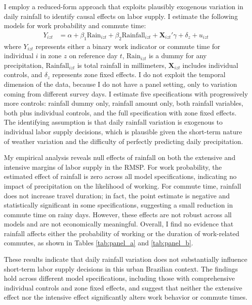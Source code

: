 I employ a reduced-form approach that exploits plausibly exogenous variation in daily rainfall to identify causal effects on labor supply. I estimate the following models for work probability and commute time:
\begin{align*}
Y_{izt} &= \alpha + \beta_1 \text{Rain}_{izt} + \beta_2 \text{Rainfall}_{izt} + \mathbf{X}_{izt}'\gamma + \delta_z + u_{izt}
\end{align*}
where $Y_{izt}$ represents either a binary work indicator or commute time for individual $i$ in zone $z$ on reference day $t$, $\text{Rain}_{izt}$ is a dummy for any precipitation, $\text{Rainfall}_{izt}$ is total rainfall in millimeters, $\mathbf{X}_{izt}$ includes individual controls, and $\delta_z$ represents zone fixed effects. I do not exploit the temporal dimension of the data, because I do not have a panel setting, only to variation coming from different survey days. I estimate five specifications with progressively more controls: rainfall dummy only, rainfall amount only, both rainfall variables, both plus individual controls, and the full specification with zone fixed effects. The identifying assumption is that daily rainfall variation is exogenous to individual labor supply decisions, which is plausible given the short-term nature of weather variation and the difficulty of perfectly predicting daily precipitation.

My empirical analysis reveals null effects of rainfall on both the extensive and intensive margins of labor supply in the RMSP. For work probability, the estimated effect of rainfall is zero across all model specifications, indicating no impact of precipitation on the likelihood of working. For commute time, rainfall does not increase travel duration; in fact, the point estimate is negative and statistically significant in some specifications, suggesting a small reduction in commute time on rainy days. However, these effects are not robust across all models and are not economically meaningful. Overall, I find no evidence that rainfall affects either the probability of working or the duration of work-related commutes, as shown in Tables \ref{tab:panel_a} and \ref{tab:panel_b}.




These results indicate that daily rainfall variation does not substantially influence short-term labor supply decisions in this urban Brazilian context. The findings hold across different model specifications, including those with comprehensive individual controls and zone fixed effects, and suggest that neither the extensive effect nor the intensive effect significantly alters work behavior or commute times.  

